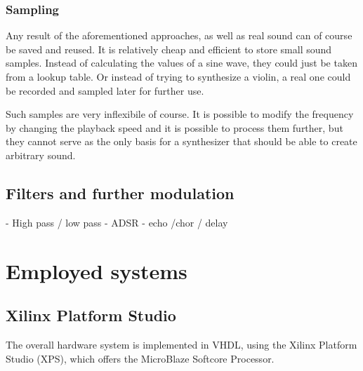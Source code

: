 		\subsubsection{Sampling}
			Any result of the aforementioned approaches, as well as real sound can of course be saved and reused.
			It is relatively cheap and efficient to store small sound samples. 
			Instead of calculating the values of a sine wave, they could just be taken from a lookup table.
			Or instead of trying to synthesize a violin, a real one could be recorded and sampled later for further use.
			
			Such samples are very inflexibile of course.
			It is possible to modify the frequency by changing the playback speed and it is possible to	process them further, but they cannot serve as the only basis for a synthesizer that should be able to create arbitrary sound.			
		\subsection{Filters and further modulation}
			\label{subsec:filters}
			- High pass / low pass
			- ADSR
			- echo /chor / delay	
		
		
		
		
			
			
			
		
	\section{Employed systems}
	  \subsection{Xilinx Platform Studio}
	    The overall hardware system is implemented in VHDL, using the Xilinx Platform Studio (XPS), which offers the MicroBlaze Softcore Processor.
